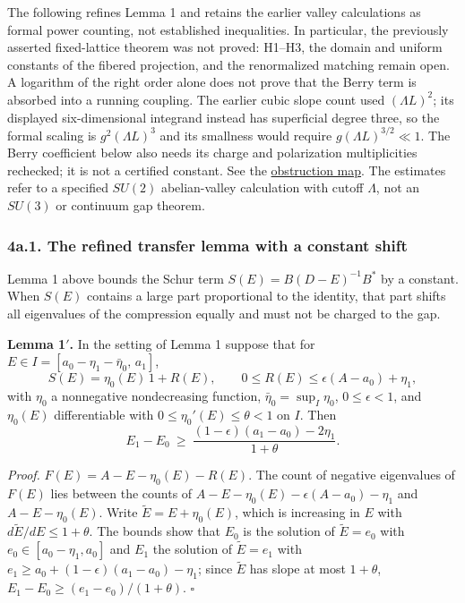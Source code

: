 \documentclass[11pt,a4paper]{article}
\begin{document}
The following refines Lemma 1 and retains the earlier valley
calculations as formal power counting, not established inequalities. In
particular, the previously asserted fixed-lattice theorem was not
proved: H1--H3, the domain and uniform constants of the fibered
projection, and the renormalized matching remain open. A logarithm of
the right order alone does not prove that the Berry term is absorbed
into a running coupling. The earlier cubic slope count used
\((\Lambda L)^2\); its displayed six-dimensional integrand instead has
superficial degree three, so the formal scaling is \(g^2(\Lambda L)^3\)
and its smallness would require \(g(\Lambda L)^{3/2}\ll1\). The Berry
coefficient below also needs its charge and polarization multiplicities
rechecked; it is not a certified constant. See the
\href{../research/obstructions.md}{obstruction map}. The estimates refer
to a specified \(SU(2)\) abelian-valley calculation with cutoff
\(\Lambda\), not an \(SU(3)\) or continuum gap theorem.

\hypertarget{a.1.-the-refined-transfer-lemma-with-a-constant-shift}{%
\subsubsection{4a.1. The refined transfer lemma with a constant
shift}\label{a.1.-the-refined-transfer-lemma-with-a-constant-shift}}

Lemma 1 above bounds the Schur term \(S(E)=B(D-E)^{-1}B^*\) by a
constant. When \(S(E)\) contains a large part proportional to the
identity, that part shifts all eigenvalues of the compression equally
and must not be charged to the gap.

\textbf{Lemma 1\('\).} In the setting of Lemma 1 suppose that for
\(E\in I=[a_0-\eta_1-\bar\eta_0,\,a_1]\),
\[S(E)=\eta_0(E)\,1+R(E),\qquad 0\le R(E)\le\epsilon(A-a_0)+\eta_1,\]
with \(\eta_0\) a nonnegative nondecreasing function,
\(\bar\eta_0=\sup_I\eta_0\), \(0\le\epsilon<1\), and \(\eta_0(E)\)
differentiable with \(0\le\eta_0'(E)\le\theta<1\) on \(I\). Then
\[E_1-E_0\ \ge\ \frac{(1-\epsilon)(a_1-a_0)-2\eta_1}{1+\theta}.\]

\emph{Proof.} \(F(E)=A-E-\eta_0(E)-R(E)\). The count of negative
eigenvalues of \(F(E)\) lies between the counts of
\(A-E-\eta_0(E)-\epsilon(A-a_0)-\eta_1\) and \(A-E-\eta_0(E)\). Write
\(\tilde E=E+\eta_0(E)\), which is increasing in \(E\) with
\(d\tilde E/dE\le1+\theta\). The bounds show that \(E_0\) is the
solution of \(\tilde E=e_0\) with \(e_0\in[a_0-\eta_1,a_0]\) and \(E_1\)
the solution of \(\tilde E=e_1\) with
\(e_1\ge a_0+(1-\epsilon)(a_1-a_0)-\eta_1\); since \(\tilde E\) has
slope at most \(1+\theta\), \(E_1-E_0\ge(e_1-e_0)/(1+\theta)\).
\(\square\)
\end{document}

